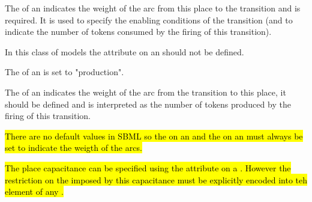 The  of an \Input indicates the weight of the arc from this place to the transition and is required. It is used to specify the enabling conditions of the transition (and to indicate the number of tokens consumed by the firing of this transition). 

In this class of models the  attribute on an \Input should not be defined.

The  of an  is set to "production". 

The  of an \Output indicates the weight of the arc from the transition to this place, it should be defined and is interpreted as  the number of tokens produced by the firing of this transition.

\hl{There are no default values in SBML so the  on an \Input and the  on an \Output must always be set to indicate the weigth of the arcs.}


\hl{The place capacitance can be specified using the  attribute on a \QualitativeSpecies. However the restriction on the \Transition imposed by this capacitance must be explicitly encoded into teh  element of any \FunctionTerm. }






